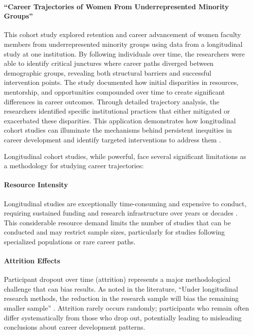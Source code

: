 \documentclass[../main.tex]{subfiles}
\begin{document}
\paragraph{``Career Trajectories of Women From Underrepresented Minority Groups''}
This cohort study explored retention and career advancement of women faculty members from underrepresented minority groups using data from a longitudinal study at one institution. By following individuals over time, the researchers were able to identify critical junctures where career paths diverged between demographic groups, revealing both structural barriers and successful intervention points. The study documented how initial disparities in resources, mentorship, and opportunities compounded over time to create significant differences in career outcomes. Through detailed trajectory analysis, the researchers identified specific institutional practices that either mitigated or exacerbated these disparities. This application demonstrates how longitudinal cohort studies can illuminate the mechanisms behind persistent inequities in career development and identify targeted interventions to address them \citep{rios2021career}.


Longitudinal cohort studies, while powerful, face several significant limitations as a methodology for studying career trajectories:

\paragraph{Resource Intensity}
Longitudinal studies are exceptionally time-consuming and expensive to conduct, requiring sustained funding and research infrastructure over years or decades \citep{wikipedia2024longitudinal}. This considerable resource demand limits the number of studies that can be conducted and may restrict sample sizes, particularly for studies following specialized populations or rare career paths.

\paragraph{Attrition Effects}
Participant dropout over time (attrition) represents a major methodological challenge that can bias results. As noted in the literature, ``Under longitudinal research methods, the reduction in the research sample will bias the remaining smaller sample'' \citep{wikipedia2024longitudinal}. Attrition rarely occurs randomly; participants who remain often differ systematically from those who drop out, potentially leading to misleading conclusions about career development patterns.
\end{document}
